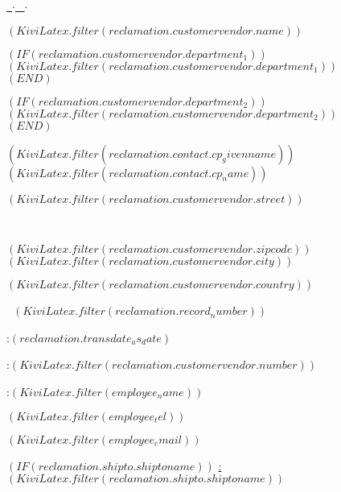 \ourfont
\begin{minipage}[t]{8cm}
  \scriptsize

  {\color{gray}\underline{\firma\ $\cdot$ \strasse\ $\cdot$ \ort}}
  \normalsize

  \vspace*{0.3cm}

  $( KiviLatex.filter(reclamation.customervendor.name ) )$

  $( IF (reclamation.customervendor.department_1) )$$( KiviLatex.filter(reclamation.customervendor.department_1) )$\\$( END )$%

  $( IF (reclamation.customervendor.department_2) )$$( KiviLatex.filter(reclamation.customervendor.department_2) )$\\$( END )$%

  $( KiviLatex.filter(reclamation.contact.cp_givenname) )$ $( KiviLatex.filter(reclamation.contact.cp_name) )$

  $( KiviLatex.filter(reclamation.customervendor.street) )$

  ~
  
  $( KiviLatex.filter(reclamation.customervendor.zipcode) )$ $( KiviLatex.filter(reclamation.customervendor.city) )$

  $( KiviLatex.filter(reclamation.customervendor.country) )$
\end{minipage}
\hfill
\begin{minipage}[t]{6cm}
  \hfill{\LARGE\textbf{\vkreklamation}}

  \vspace*{0.2cm}

  \hfill{\large\textbf{\nr ~$( KiviLatex.filter(reclamation.record_number) )$}}

  \vspace*{0.2cm}

  \datum:\hfill $( reclamation.transdate_as_date )$

  \kundennummer:\hfill $( KiviLatex.filter(reclamation.customervendor.number) )$

  \ansprechpartner:\hfill $( KiviLatex.filter(employee_name) )$

  \textTelefon \hfill $( KiviLatex.filter(employee_tel) )$

  \textEmail \hfill $( KiviLatex.filter(employee_email) )$
\end{minipage}

$( IF (reclamation.shipto.shiptoname) )$%
  \vspace{0.8cm}
  \scriptsize \underline{\abweichendeLieferadresse:}\\
  \normalsize    $( KiviLatex.filter(reclamation.shipto.shiptoname) )$

